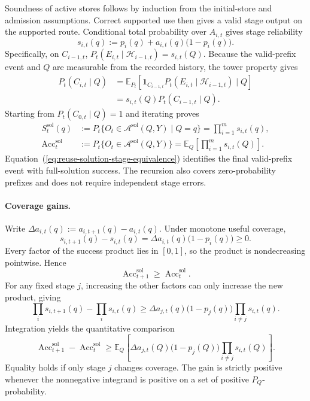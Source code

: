 \documentclass[10pt]{article} %
\renewcommand{\eqref}[1]{\textup{(\ref{#1})}}
\providecommand{\1}{\mathbf{1}}  %
\theoremstyle{remark}
\theoremstyle{definition}
\begin{document}
Soundness of active stores follows by induction from the initial-store
and admission assumptions. Correct supported use then gives a valid
stage output on the supported route. Conditional total probability over
$A_{i,t}$ gives stage reliability
\begin{equation}
s_{i,t}(q):=p_i(q)+a_{i,t}(q)\bigl(1-p_i(q)\bigr).
\label{eq:reuse-stage-reliability}
\end{equation}
Specifically, on $C_{i-1,t}$,
$P_t(E_{i,t}\mid\mathcal H_{i-1,t})=s_{i,t}(Q)$.
Because the valid-prefix event and $Q$ are measurable from the recorded
history, the tower property gives
\begin{align*}
P_t(C_{i,t}\mid Q)
&=\mathbb E_{P_t}\!\left[
\mathbf 1_{C_{i-1,t}}
P_t(E_{i,t}\mid\mathcal H_{i-1,t})\mid Q\right]\\
&=s_{i,t}(Q)P_t(C_{i-1,t}\mid Q).
\end{align*}
Starting from $P_t(C_{0,t}\mid Q)=1$ and iterating proves
\begin{align}
S_t^{\mathrm{sol}}(q)
&:=P_t\{O_t\in\mathcal A^{\mathrm{sol}}(Q,Y)\mid Q=q\}
=\prod_{i=1}^{m}s_{i,t}(q),
\label{eq:reuse-success-product}\\
\operatorname{Acc}^{\mathrm{sol}}_t
&:=P_t\{O_t\in\mathcal A^{\mathrm{sol}}(Q,Y)\}
=\mathbb E_Q\!\left[\prod_{i=1}^{m}s_{i,t}(Q)\right].
\label{eq:reuse-population-accuracy}
\end{align}
Equation~\eqref{eq:reuse-solution-stage-equivalence} identifies the final
valid-prefix event with full-solution success. The recursion also covers
zero-probability prefixes and does not require independent stage errors.

\paragraph{Coverage gains.}

Write $\Delta a_{i,t}(q):=a_{i,t+1}(q)-a_{i,t}(q)$. Under monotone
useful coverage,
\[
s_{i,t+1}(q)-s_{i,t}(q)
=\Delta a_{i,t}(q)\bigl(1-p_i(q)\bigr)\geq0.
\]
Every factor of the success product lies in $[0,1]$, so the product
is nondecreasing pointwise. Hence
\begin{equation}
\operatorname{Acc}^{\mathrm{sol}}_{t+1}
\geq\operatorname{Acc}^{\mathrm{sol}}_t.
\label{eq:reuse-accuracy-monotonicity}
\end{equation}
For any fixed stage $j$, increasing the other factors can only increase
the new product, giving
\[
\prod_i s_{i,t+1}(q)-\prod_i s_{i,t}(q)
\geq\Delta a_{j,t}(q)\bigl(1-p_j(q)\bigr)
\prod_{i\neq j}s_{i,t}(q).
\]
Integration yields the quantitative comparison
\begin{equation}
\operatorname{Acc}^{\mathrm{sol}}_{t+1}
-\operatorname{Acc}^{\mathrm{sol}}_t
\geq\mathbb E_Q\!\left[
\Delta a_{j,t}(Q)\bigl(1-p_j(Q)\bigr)
\prod_{i\neq j}s_{i,t}(Q)\right].
\label{eq:reuse-single-stage-gain}
\end{equation}
Equality holds if only stage $j$ changes coverage. The gain is strictly
positive whenever the nonnegative integrand is positive on a set of
positive $P_Q$-probability.
\end{document}
